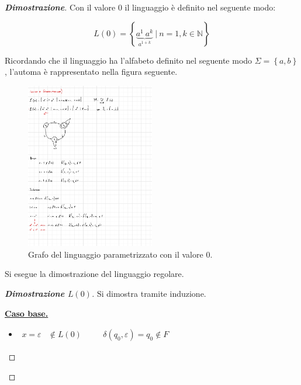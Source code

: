 \documentclass[a4paper]{article}
\begin{document}
	\begin{proof}[\textcolor{Blue3}{\textbf{Dimostrazione}}]
		Con il valore $0$ il linguaggio è definito nel seguente modo:
		
		\begin{equation*}
			L\left(0\right) = \left\{\underbrace{a^{1} \: a^{k}}_{a^{1+k}} \: \left| \: n = 1, k \in \mathbb{N} \right.\right\}
		\end{equation*}
	
		\noindent
		Ricordando che il linguaggio ha l'alfabeto definito nel seguente modo $\Sigma = \left\{a,b\right\}$, l'automa è rappresentato nella figura seguente.
		
		\begin{figure}[!htp]
			\centering
			\includegraphics[width=0.5\textwidth]{img/esercitazioni/03_exe1.pdf}
			\caption{Grafo del linguaggio parametrizzato con il valore $0$.}
		\end{figure}
	
		\noindent
		Si esegue la dimostrazione del linguaggio regolare.
		
		\newpage
		
		\begin{proof}[\textbf{Dimostrazione $L\left(0\right)$}]
			Si dimostra tramite induzione.\newline
			
			\noindent
			\textbf{\underline{Caso base.}}\newline
			
			\begin{itemize}[label=-]
				\item $\begin{array}{lllll}
					x = \varepsilon & \notin L\left(0\right) & \hspace{1em} & \delta\left(q_{0}, \varepsilon\right) = q_{0} \notin F
				\end{array}$
				

\end{itemize}
\end{proof}
\end{proof}
\end{document}
